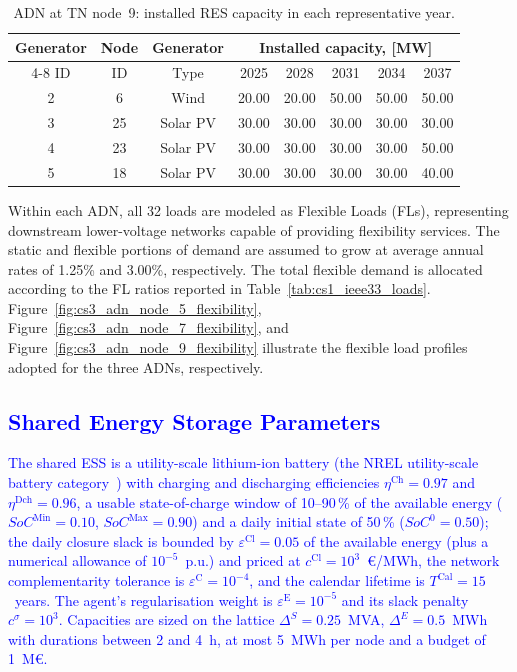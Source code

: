 \documentclass[preprint,12pt]{elsarticle}
\begin{document}
\begin{table}[htbp!]
    \centering
    \caption{ADN at TN node~9: installed RES capacity in each representative year.}
    \begin{tabular}{ccc ccccc}
        \toprule
        Generator   & Node  & Generator & \multicolumn{5}{c}{Installed capacity, [MW]}\\  \cmidrule{4-8}
        ID          & ID    & Type      & 2025  & 2028  & 2031  & 2034   & 2037 \\ 
        \midrule
        2 & 6  & Wind     & 20.00 & 20.00 & 50.00 & 50.00 & 50.00\\
        3 & 25 & Solar PV & 30.00 & 30.00 & 30.00 & 30.00 & 30.00\\
        4 & 23 & Solar PV & 30.00 & 30.00 & 30.00 & 30.00 & 50.00\\
        5 & 18 & Solar PV & 30.00 & 30.00 & 30.00 & 30.00 & 40.00\\
        \bottomrule
    \end{tabular}
    \label{tab:cs3_adn_node_9_res_generators}
\end{table}

Within each ADN, all 32 loads are modeled as Flexible Loads (FLs), representing downstream lower-voltage networks capable of providing flexibility services. The static and flexible portions of demand are assumed to grow at average annual rates of 1.25\% and 3.00\%, respectively. The total flexible demand is allocated according to the FL ratios reported in Table~\ref{tab:cs1_ieee33_loads}. Figure~\ref{fig:cs3_adn_node_5_flexibility}, Figure~\ref{fig:cs3_adn_node_7_flexibility}, and Figure~\ref{fig:cs3_adn_node_9_flexibility} illustrate the flexible load profiles adopted for the three ADNs, respectively.

\subsection{\textcolor{blue}{Shared Energy Storage Parameters}}
\label{sec:case_ess_params}

\textcolor{blue}{
    The shared ESS is a utility-scale lithium-ion battery (the NREL utility-scale battery category~\cite{nrel_ess_costs}) with charging and discharging efficiencies $\eta^{\text{Ch}} = 0.97$ and $\eta^{\text{Dch}} = 0.96$, a usable state-of-charge window of 10--90\,\% of the available energy ($SoC^{\text{Min}} = 0.10$, $SoC^{\text{Max}} = 0.90$) and a daily initial state of 50\,\% ($SoC^{0} = 0.50$); the daily closure slack is bounded by $\varepsilon^{\text{Cl}} = 0.05$ of the available energy (plus a numerical allowance of $10^{-5}$~p.u.) and priced at  $c^{\text{Cl}} = 10^{3}$~\euro/MWh, the network complementarity tolerance is $\varepsilon^{\text{C}} = 10^{-4}$, and the calendar lifetime is $T^{\text{Cal}} = 15$~years. The agent's regularisation weight is $\varepsilon^{\text{E}} = 10^{-5}$ and its slack penalty $c^{\sigma} = 10^{3}$. Capacities are sized on the lattice $\Delta^S = 0.25$~MVA, $\Delta^E = 0.5$~MWh with durations between 2 and 4~h, at most 5~MWh per node and a budget of 1~M\euro.
}
\end{document}

